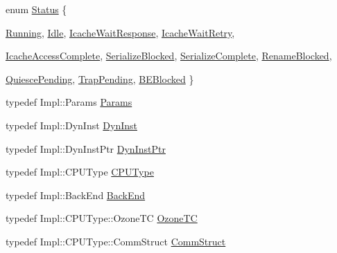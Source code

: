 \begin{DoxyCompactItemize}
\item 
enum \hyperlink{classFrontEnd_a67a0db04d321a74b7e7fcfd3f1a3f70b}{Status} \{ \par
\hyperlink{classFrontEnd_a67a0db04d321a74b7e7fcfd3f1a3f70ba2f5f2c4a8c4f4f0519d503dcdfbf55cb}{Running}, 
\hyperlink{classFrontEnd_a67a0db04d321a74b7e7fcfd3f1a3f70bad3fa9ae9431d6cb1772f9d9df48cab19}{Idle}, 
\hyperlink{classFrontEnd_a67a0db04d321a74b7e7fcfd3f1a3f70baa694766f134e9cd81f5ad5b91dedf852}{IcacheWaitResponse}, 
\hyperlink{classFrontEnd_a67a0db04d321a74b7e7fcfd3f1a3f70ba2a36c8d85e537909b8fa14af846e48a3}{IcacheWaitRetry}, 
\par
\hyperlink{classFrontEnd_a67a0db04d321a74b7e7fcfd3f1a3f70baff0dbe49b2bc9aee96de6b007b5b826e}{IcacheAccessComplete}, 
\hyperlink{classFrontEnd_a67a0db04d321a74b7e7fcfd3f1a3f70ba806b5780135449a5572df8b7afe9d9d5}{SerializeBlocked}, 
\hyperlink{classFrontEnd_a67a0db04d321a74b7e7fcfd3f1a3f70ba1aad3d3d6093186d4e0fe0db9ba433ea}{SerializeComplete}, 
\hyperlink{classFrontEnd_a67a0db04d321a74b7e7fcfd3f1a3f70ba2828f5cf5f4747c5c75fbe0cfa5c1323}{RenameBlocked}, 
\par
\hyperlink{classFrontEnd_a67a0db04d321a74b7e7fcfd3f1a3f70ba6dd2239b509a3ed085ad3bddda99cb16}{QuiescePending}, 
\hyperlink{classFrontEnd_a67a0db04d321a74b7e7fcfd3f1a3f70ba8c49adf6da5f507150d403610c684877}{TrapPending}, 
\hyperlink{classFrontEnd_a67a0db04d321a74b7e7fcfd3f1a3f70bad1b955879ac78b2f484bfc8a8f76ee23}{BEBlocked}
 \}
\item 
typedef Impl::Params \hyperlink{classFrontEnd_a818e103eae798a24a06a0a34631849ea}{Params}
\item 
typedef Impl::DynInst \hyperlink{classFrontEnd_ab741745c86a14c765b999c11167636d9}{DynInst}
\item 
typedef Impl::DynInstPtr \hyperlink{classFrontEnd_a028ce10889c5f6450239d9e9a7347976}{DynInstPtr}
\item 
typedef Impl::CPUType \hyperlink{classFrontEnd_ad0cc927c8534eaba1d99c29b2942311f}{CPUType}
\item 
typedef Impl::BackEnd \hyperlink{classFrontEnd_a3de526baa0cbb2b55bf669a6f7bf81cc}{BackEnd}
\item 
typedef Impl::CPUType::OzoneTC \hyperlink{classFrontEnd_a4732af5c8908e169c3e86ef8a5bac05f}{OzoneTC}
\item 
typedef Impl::CPUType::CommStruct \hyperlink{classFrontEnd_ab99b68ad737741b1d3a073f2df88752a}{CommStruct}
\end{DoxyCompactItemize}
